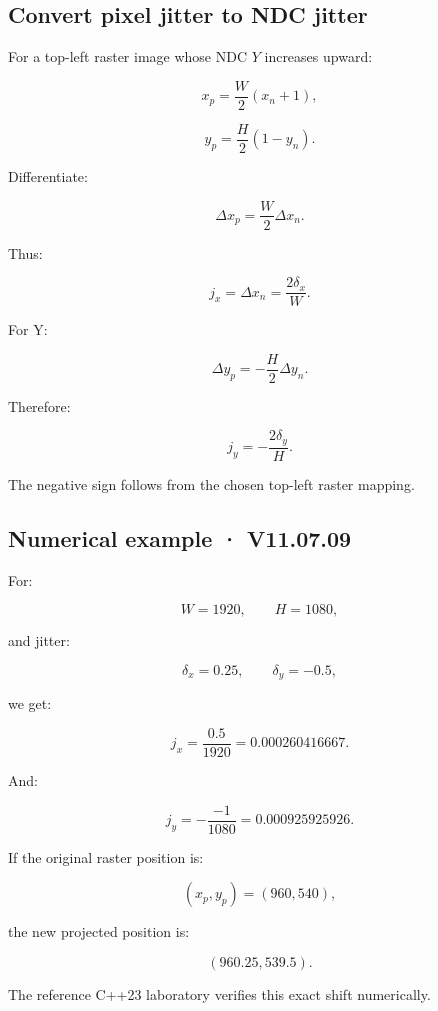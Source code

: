 \subsection{Convert pixel jitter to NDC jitter}\label{02-foundations-ii-ch036-convert-pixel-jitter-to-ndc-jitter}

\hypertarget{02-foundations-ii-ch036-convert-pixel-jitter-to-ndc-jitter}{}

For a top-left raster image whose NDC \(Y\) increases upward:

\[
 x_p=\frac{W}{2}(x_n+1),
\]

\[
 y_p=\frac{H}{2}(1-y_n).
\]

Differentiate:

\[
 \Delta x_p=\frac W2\Delta x_n.
\]

Thus:

\[
 \boxed{ j_x=\Delta x_n=\frac{2\delta_x}{W} }.
\]

For Y:

\[
 \Delta y_p=-\frac H2\Delta y_n.
\]

Therefore:

\[
 \boxed{ j_y=-\frac{2\delta_y}{H} }.
\]

The negative sign follows from the chosen top-left raster mapping.

\subsection{Numerical example · V11.07.09}\label{02-foundations-ii-ch036-numerical-example-v11.07.09}

\hypertarget{02-foundations-ii-ch036-numerical-example-v11.07.09}{}

For:

\[
 W=1920,\qquad H=1080,
\]

and jitter:

\[
 \delta_x=0.25,\qquad\delta_y=-0.5,
\]

we get:

\[
 j_x=\frac{0.5}{1920} =\boxed{0.000260416667}.
\]

And:

\[
 j_y=-\frac{-1}{1080} =\boxed{0.000925925926}.
\]

If the original raster position is:

\[
 (x_p,y_p)=(960,540),
\]

the new projected position is:

\[
 \boxed{(960.25,539.5)}.
\]

The reference C++23 laboratory verifies this exact shift numerically.


